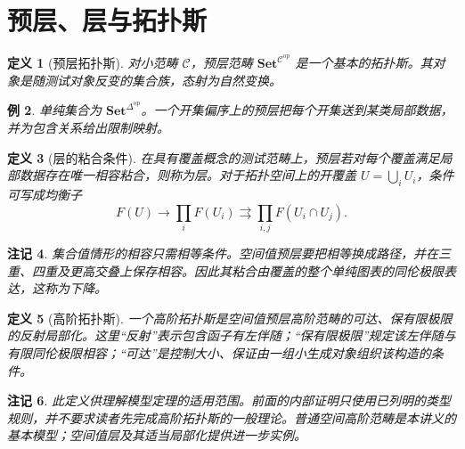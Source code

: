\documentclass[12pt,oneside,openany,fontset=none]{ctexbook}
\theoremstyle{cn}
\newtheorem{definition}{定义}[chapter]
\newtheorem{example}[definition]{例}
\newtheorem{remark}[definition]{注记}
\numberwithin{equation}{chapter}
\newcommand{\Set}{\mathbf{Set}}
\newcommand{\op}{\mathrm{op}}
\begin{document}
\section{预层、层与拓扑斯}
\begin{definition}[预层拓扑斯]
对小范畴 $\mathcal C$，预层范畴 $\Set^{\mathcal C^{\op}}$ 是一个基本的拓扑斯。其对象是随测试对象反变的集合族，态射为自然变换。
\end{definition}
\begin{example}
单纯集合为 $\Set^{\Delta^{\op}}$。一个开集偏序上的预层把每个开集送到某类局部数据，并为包含关系给出限制映射。
\end{example}
\begin{definition}[层的粘合条件]
在具有覆盖概念的测试范畴上，预层若对每个覆盖满足局部数据存在唯一相容粘合，则称为层。对于拓扑空间上的开覆盖 $U=\bigcup_iU_i$，条件可写成均衡子
\[
F(U)\longrightarrow\prod_iF(U_i)
\rightrightarrows\prod_{i,j}F(U_i\cap U_j).
\]
\end{definition}
\begin{remark}
集合值情形的相容只需相等条件。空间值预层要把相等换成路径，并在三重、四重及更高交叠上保存相容。因此其粘合由覆盖的整个单纯图表的同伦极限表达，这称为下降。
\end{remark}
\begin{definition}[高阶拓扑斯]
一个高阶拓扑斯是空间值预层高阶范畴的可达、保有限极限的反射局部化。这里“反射”表示包含函子有左伴随；“保有限极限”规定该左伴随与有限同伦极限相容；“可达”是控制大小、保证由一组小生成对象组织该构造的条件。
\end{definition}
\begin{remark}
此定义供理解模型定理的适用范围。前面的内部证明只使用已列明的类型规则，并不要求读者先完成高阶拓扑斯的一般理论。普通空间高阶范畴是本讲义的基本模型；空间值层及其适当局部化提供进一步实例\cite{LurieHTT,RiehlSemantics}。
\end{remark}
\end{document}
